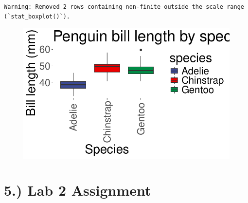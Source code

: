 \documentclass[
  letterpaper,
  DIV=11,
  numbers=noendperiod]{scrartcl}
\begin{document}
\begin{verbatim}
Warning: Removed 2 rows containing non-finite outside the scale range
(`stat_boxplot()`).
\end{verbatim}

\begin{figure}[H]

{\centering \includegraphics{Lab_2_files/figure-pdf/unnamed-chunk-46-1.pdf}

}

\end{figure}

\hypertarget{lab-2-assignment}{%
\section{\texorpdfstring{\textbf{5.) Lab 2
Assignment}}{5.) Lab 2 Assignment}}\label{lab-2-assignment}}
\end{document}
